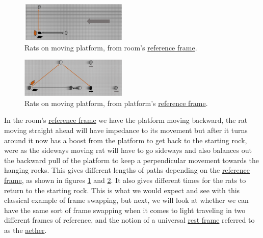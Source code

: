 \begin{paracol}{2}
	\begin{figure}[H]
		\centering
		\includegraphics[width=0.45\textwidth]{images/pdf/rats_moving.pdf}
		\caption{Rats on moving platform, from room's \protect\hyperlink{def-Reference-frame}{reference frame}.}
		\label{fig: rat with moving platform}
	\end{figure}
	\switchcolumn
	\begin{figure}[H]
		\centering
		\includegraphics[width=0.45\textwidth]{images/pdf/rats_platform_frame.pdf}
		\caption{Rats on moving platform, from platform's \protect\hyperlink{def-Reference-frame}{reference frame}.}
		\label{fig: rat platform reference frame}
	\end{figure}
\end{paracol}

In the room's \hyperlink{def-Reference-frame}{reference frame} we have the platform moving backward, the rat moving straight ahead will have impedance to its movement but after it turns around it now has a boost from the platform to get back to the starting rock, were as the sideways moving rat will have to go sideways and also balances out the backward pull of the platform to keep a perpendicular movement towards the hanging rocks. This gives different lengths of paths depending on the \hyperlink{def-Reference-frame}{reference frame}, as shown in figures \ref{fig: rat with moving platform} and \ref{fig: rat platform reference frame}. It also gives different times for the rats to return to the starting rock. This is what we would expect and see with this classical example of frame swapping, but next, we will look at whether we can have the same sort of frame swapping when it comes to light traveling in two different frames of reference, and the notion of a universal \hyperlink{def-proper-frame}{rest frame} referred to as the \hyperlink{def-aether}{aether}.

